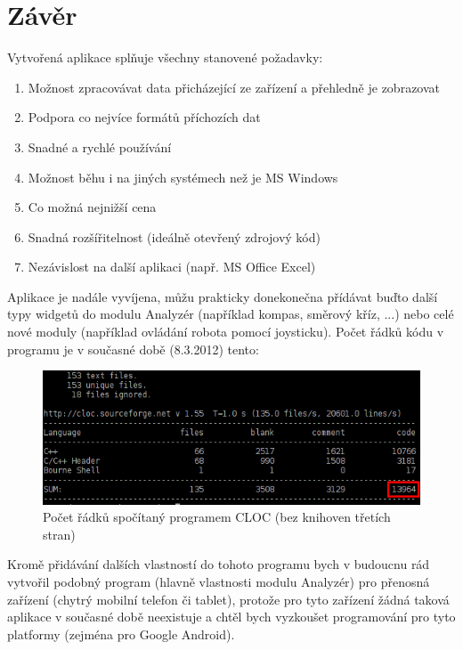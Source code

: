 \documentclass[12pt, a4paper, oneside]{article}
\newcommand{\Has}{\textcolor{green}{\CheckmarkBold}}
\begin{document}
\section*{Závěr}
Vytvořená aplikace splňuje všechny stanovené požadavky:
\begin{enumerate}[label=\Has\hspace{1.5mm}\arabic{*}.]
    \item Možnost zpracovávat data přicházející ze zařízení a přehledně je zobrazovat%
    \item Podpora co nejvíce formátů příchozích dat%
    \item Snadné a rychlé používání %
    \item Možnost běhu i na jiných systémech než je MS Windows %
    \item Co možná nejnižší cena %
    \item Snadná rozšířitelnost (ideálně otevřený zdrojový kód) %
    \item Nezávislost na další aplikaci (např. MS Office Excel) %
\end{enumerate}

Aplikace je nadále vyvíjena, můžu prakticky donekonečna přídávat buďto další typy widgetů do modulu Analyzér (například kompas, směrový kříz, ...) nebo celé nové moduly (například ovládání robota pomocí joysticku). Počet řádků kódu v programu je v současné době (8.3.2012) tento:
\begin{figure}[H]
\begin{center}
\includegraphics[width=\textwidth]{img/cloc_edit.png}
\caption{Počet řádků spočítaný programem CLOC\cite{cloc} (bez knihoven třetích stran)}
\end{center}
\end{figure}

Kromě přidávání dalších vlastností do tohoto programu bych v budoucnu rád vytvořil podobný program (hlavně vlastnosti modulu Analyzér) pro přenosná zařízení (chytrý mobilní telefon či tablet), protože pro tyto zařízení žádná taková aplikace v současné době neexistuje a chtěl bych vyzkoušet programování pro tyto platformy (zejména pro Google Android\cite{android}).
\end{document}
